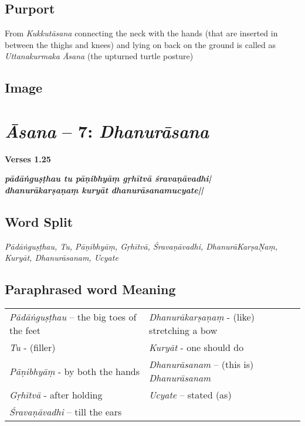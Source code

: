 \subsection*{Purport}

From \textit{Kukkutāsana} connecting the neck with the hands (that are inserted in between the thighs and knees) and lying on back on the ground is called as \textit{Uttanakurmaka} \textit{Āsana} (the upturned turtle posture)

\subsection*{Image}
\newpage

\section*{\textit{Āsana} -- 7: \textit{Dhanurāsana}}

\noindent 
\textbf{Verses 1.25}

\begin{shloka}
\textit{\textbf{pādāṅguṣṭhau tu pāṇibhyāṃ gṛhītvā śravaṇāvadhi|}\\
\textbf{dhanurākarṣaṇaṃ kuryāt dhanurāsanamucyate||}}
\end{shloka}

\subsection*{Word Split}

\textit{Pādāṅguṣṭhau, Tu, Pāṇibhyāṃ, Gṛhītvā, Śravaṇāvadhi, Dhanurā\-Karṣa\-Ṇaṃ, Kuryāt, Dhanurāsanam, Ucyate}

\subsection*{Paraphrased word Meaning}

\begin{longtable}{>{\noindent\raggedright}p{5cm}>{\noindent\raggedright}p{5cm}}
\textit{Pādāṅguṣṭhau} – the big toes of the feet  & \textit{Dhanurākarṣaṇaṃ} - (like) stretching a bow \tabularnewline
\textit{Tu}  - (filler)  & \textit{Kuryāt}  - one should do\tabularnewline
\textit{Pāṇibhyāṃ} - by both the hands  & \textit{Dhanurāsanam} – (this is) \textit{Dhanurāsanam}\tabularnewline
\textit{Gṛhītvā}  - after holding  & \textit{Ucyate} – stated (as)\tabularnewline
\textit{Śravaṇāvadhi} – till the ears & 
\end{longtable}

